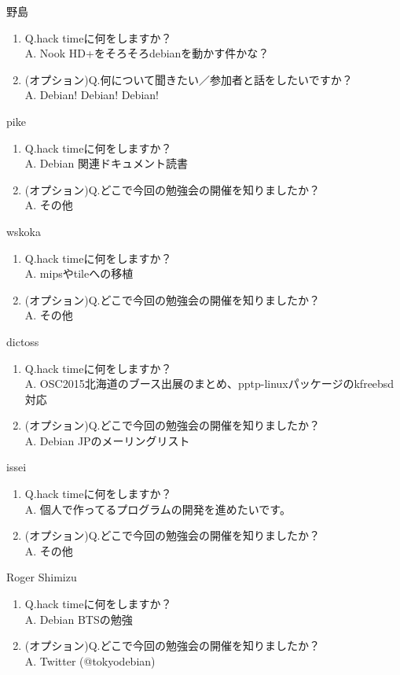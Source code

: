 \begin{prework}{ 野島 }
  \begin{enumerate}
  \item Q.hack timeに何をしますか？\\
    A. Nook HD+をそろそろdebianを動かす件かな？
  \item (オプション)Q.何について聞きたい／参加者と話をしたいですか？\\
    A. Debian! Debian! Debian!
  \end{enumerate}
\end{prework}

\begin{prework}{ pike }
  \begin{enumerate}
  \item Q.hack timeに何をしますか？\\
    A. Debian 関連ドキュメント読書
  \item (オプション)Q.どこで今回の勉強会の開催を知りましたか？\\
    A. その他
  \end{enumerate}
\end{prework}

\begin{prework}{ wskoka }
  \begin{enumerate}
  \item Q.hack timeに何をしますか？\\
    A. mipsやtileへの移植
  \item (オプション)Q.どこで今回の勉強会の開催を知りましたか？\\
    A. その他
  \end{enumerate}
\end{prework}

\begin{prework}{ dictoss }
  \begin{enumerate}
  \item Q.hack timeに何をしますか？\\
    A. OSC2015北海道のブース出展のまとめ、pptp-linuxパッケージのkfreebsd対応
  \item (オプション)Q.どこで今回の勉強会の開催を知りましたか？\\
    A. Debian JPのメーリングリスト
  \end{enumerate}
\end{prework}

\begin{prework}{ issei }
  \begin{enumerate}
  \item Q.hack timeに何をしますか？\\
    A. 個人で作ってるプログラムの開発を進めたいです。
  \item (オプション)Q.どこで今回の勉強会の開催を知りましたか？\\
    A. その他
  \end{enumerate}
\end{prework}

\begin{prework}{Roger Shimizu}
  \begin{enumerate}
  \item Q.hack timeに何をしますか？\\
    A. Debian BTSの勉強
  \item (オプション)Q.どこで今回の勉強会の開催を知りましたか？\\
    A. Twitter (@tokyodebian)
  \end{enumerate}
\end{prework}

